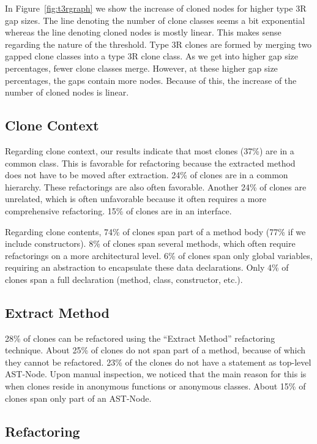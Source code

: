 In Figure~\ref{fig:t3rgraph} we show the increase of cloned nodes for higher type 3R gap sizes. The line denoting the number of clone classes seems a bit exponential whereas the line denoting cloned nodes is mostly linear. This makes sense regarding the nature of the threshold. Type 3R clones are formed by merging two gapped clone classes into a type 3R clone class. As we get into higher gap size percentages, fewer clone classes merge. However, at these higher gap size percentages, the gaps contain more nodes. Because of this, the increase of the number of cloned nodes is linear.

\subsection{Clone Context}
Regarding clone context, our results indicate that most clones (37\%) are in a common class. This is favorable for refactoring because the extracted method does not have to be moved after extraction. 24\% of clones are in a common hierarchy. These refactorings are also often favorable. Another 24\% of clones are unrelated, which is often unfavorable because it often requires a more comprehensive refactoring. 15\% of clones are in an interface.

Regarding clone contents, 74\% of clones span part of a method body (77\% if we include constructors). 8\% of clones span several methods, which often require refactorings on a more architectural level. 6\% of clones span only global variables, requiring an abstraction to encapsulate these data declarations. Only 4\% of clones span a full declaration (method, class, constructor, etc.).

\subsection{Extract Method}
28\% of clones can be refactored using the ``Extract Method'' refactoring technique. About 25\% of clones do not span part of a method, because of which they cannot be refactored. 23\% of the clones do not have a statement as top-level AST-Node. Upon manual inspection, we noticed that the main reason for this is when clones reside in anonymous functions or anonymous classes. About 15\% of clones span only part of an AST-Node.

\subsection{Refactoring}

